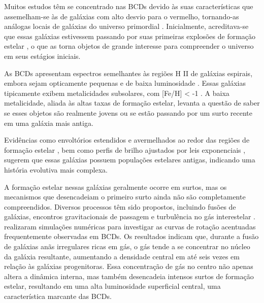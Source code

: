 Muitos estudos têm se concentrado nas BCDs devido às suas características que assemelham-se às de galáxias com alto desvio para o vermelho, tornando-as análogas locais de galáxias do universo primordial \citep{Papaderos_2006}. Inicialmente, acreditava-se que essas galáxias estivessem passando por suas primeiras explosões de formação estelar \citep{Searle_1973, Aloisi_1999, Thuan_1999}, o que as torna objetos de grande interesse para compreender o universo em seus estágios iniciais.

As BCDs apresentam espectros semelhantes às regiões H II de galáxias espirais, embora sejam opticamente pequenas e de baixa luminosidade \citep{Thuan_Martin_1981}. Essas galáxias tipicamente exibem metalicidades subsolares, com [Fe/H] < -1 \citep{Drozdovsky_Tikhonov_2000, Drozdovsky_2001}. A baixa metalicidade, aliada às altas taxas de formação estelar, levanta a questão de saber se esses objetos são realmente jovens ou se estão passando por um surto recente em uma galáxia mais antiga.

Evidências como envoltórios estendidos e avermelhados ao redor das regiões de formação estelar \citep{Loose_1985, Kunth_1985}, bem como perfis de brilho ajustados por leis exponenciais \citep{James_1994, Telles_1995, Papaderos_1996, Cairos_1998}, sugerem que essas galáxias possuem populações estelares antigas, indicando uma história evolutiva mais complexa.

A formação estelar nessas galáxias geralmente ocorre em surtos, mas os mecanismos que desencadeiam o primeiro surto ainda não são completamente compreendidos. Diversos processos têm sido propostos, incluindo fusões de galáxias, encontros gravitacionais de passagem e turbulência no gás interestelar \citep{Noeske_2001, Pustilnik_2001, Bekki_2008}. \cite{Watts_2016} realizaram simulações numéricas para investigar as curvas de rotação acentuadas frequentemente observadas em BCDs. Os resultados indicam que, durante a fusão de galáxias anãs irregulares ricas em gás, o gás tende a se concentrar no núcleo da galáxia resultante, aumentando a densidade central em até seis vezes em relação às galáxias progenitoras. Essa concentração de gás no centro não apenas altera a dinâmica interna, mas também desencadeia intensos surtos de formação estelar, resultando em uma alta luminosidade superficial central, uma característica marcante das BCDs.


